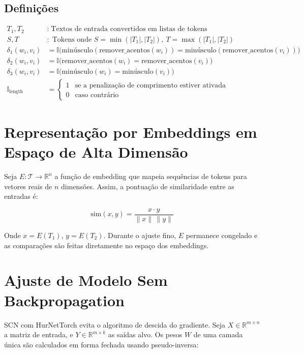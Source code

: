 \documentclass[11pt]{article}
\begin{document}
\subsection*{Definições}
\begin{align*}
T_1, T_2 &:\; \text{Textos de entrada convertidos em listas de tokens} \\
S, T &:\; \text{Tokens onde } S = \min(|T_1|, |T_2|),\ T = \max(|T_1|, |T_2|) \\
\delta_1(w_i, v_i) &= \mathbb{I}\bigl(\text{minúsculo}(\mathrm{remover\_acentos}(w_i)) = \text{minúsculo}(\mathrm{remover\_acentos}(v_i))\bigr) \\
\delta_2(w_i, v_i) &= \mathbb{I}\bigl(\mathrm{remover\_acentos}(w_i) = \mathrm{remover\_acentos}(v_i)\bigr) \\
\delta_3(w_i, v_i) &= \mathbb{I}\bigl(\text{minúsculo}(w_i) = \text{minúsculo}(v_i)\bigr) \\
\mathbb{I}_{\text{length}} &=
\begin{cases}
1 & \text{se a penalização de comprimento estiver ativada} \\
0 & \text{caso contrário}
\end{cases}
\end{align*}

\section{Representação por Embeddings em Espaço de Alta Dimensão}
Seja $E: \mathcal{T} \rightarrow \mathbb{R}^n$ a função de embedding que mapeia sequências de tokens para vetores reais de $n$ dimensões. Assim, a pontuação de similaridade entre as entradas é:

\begin{equation}
\text{sim}(x, y) = \frac{x \cdot y}{\|x\| \, \|y\|}
\end{equation}

Onde $x = E(T_1)$, $y = E(T_2)$. Durante o ajuste fino, $E$ permanece congelado e as comparações são feitas diretamente no espaço dos embeddings.

\section{Ajuste de Modelo Sem Backpropagation}
SCN com HurNetTorch evita o algoritmo de descida do gradiente. Seja $X \in \mathbb{R}^{m \times n}$ a matriz de entrada, e $Y \in \mathbb{R}^{m \times k}$ as saídas alvo. Os pesos $W$ de uma camada única são calculados em forma fechada usando pseudo-inversa:
\end{document}
